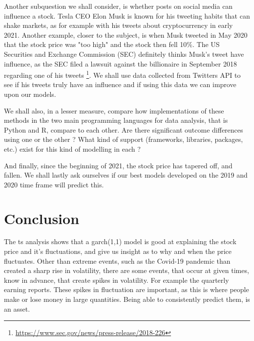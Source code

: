\documentclass[10pt]{report}
\begin{document}
Another subquestion we shall consider, is whether posts on social media can influence a stock.
Tesla CEO Elon Musk is known for his tweeting habits that can shake markets, as for example with his tweets about cryptocurrency in early 2021. Another example, closer to the subject, is when Musk tweeted in May 2020 that the stock price was "too high" and the stock then fell 10$\%$. The US Securities and Exchange Commission (SEC) definitely thinks Musk's tweet have influence, as the SEC filed a lawsuit against the billionaire in September 2018 regarding one of his tweets \footnote{\url{https://www.sec.gov/news/press-release/2018-226}}. We shall use data collected from Twitters API to see if his tweets truly have an influence and if using this data we can improve upon our models.


We shall also, in a lesser measure, compare how implementations of these methods in the two main programming languages for data analysis, that is Python and R, compare to each other. Are there significant outcome differences using one or the other ? What kind of support (frameworks, libraries, packages, etc.) exist for this kind of modelling in each ?

And finally, since the beginning of 2021, the stock price has tapered off, and fallen. We shall lastly ask ourselves if our best models developed on the 2019 and 2020 time frame will predict this.











\chapter{Conclusion}

The \acrlong{ts} analysis shows that a \acrshort{garch}(1,1) model is good at explaining the stock price and it's fluctuations, and give us insight as to why and when the price fluctuates. Other than extreme events, such as the Covid-19 pandemic than created a sharp rise in volatility, there are some events, that occur at given times, know in advance, that create spikes in volatility. For example the quarterly earning reports. These spikes in fluctuation are important, as this is where people make or lose money in large quantities. Being able to consistently predict them, is an asset.
\end{document}
